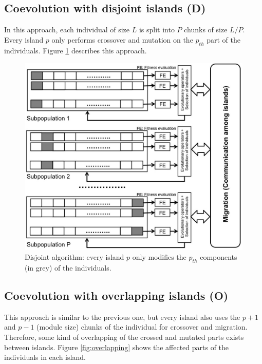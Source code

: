 \documentclass[preprint]{elsarticle}
\begin{document}
\subsection{Coevolution with disjoint islands (D)} 
In this approach, each individual of size $L$ is split into $P$ chunks of size $L/P$. Every island $p$ only performs crossover and mutation on the $p_{th}$ part of the individuals. Figure \ref{fig:disjoint} describes this approach.  

\begin{figure}
\centering
\includegraphics[width=12cm]{islandDisjoint.jpg}
\caption{Disjoint algorithm: every island $p$ only modifies the $p_{th}$ components (in grey) of the individuals.}
\label{fig:disjoint}
\end{figure}

\subsection{Coevolution with overlapping islands (O)}
This approach is similar to the previous one, but every island also uses the $p+1$ and $p-1$ (module size) chunks of the individual for crossover and migration. Therefore, some kind of overlapping of the crossed and mutated parts exists between islands. Figure \ref{fig:overlapping} shows the affected parts of the individuals in
each island. 
\end{document}
